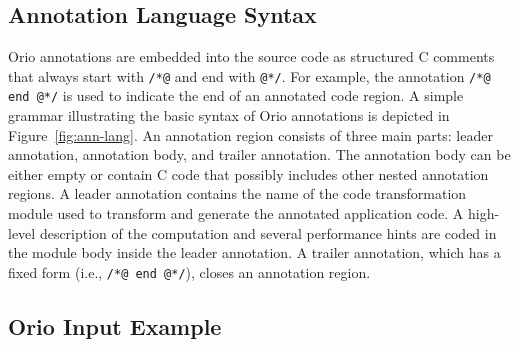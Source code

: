 
\subsection{Annotation Language Syntax} 
\label{sec:ann-lang}

Orio annotations are embedded into the source code as structured C comments
that always start with \texttt{/*@} and end with \texttt{@*/}. For example,
the annotation \texttt{/*@ end @*/} is used to indicate the end of an
annotated code region. A simple grammar illustrating the basic syntax of Orio
annotations is depicted in Figure~\ref{fig:ann-lang}. An annotation region
consists of three main parts: leader annotation, annotation body, and trailer
annotation. The annotation body can be either empty or contain C code that
possibly includes other nested annotation regions. A leader annotation
contains the name of the code transformation module used to transform and
generate the annotated application code. A high-level description of the
computation and several performance hints are coded in the module body inside
the leader annotation. A trailer annotation, which has a fixed form (i.e.,
\texttt{/*@ end @*/}), closes an annotation region.

\subsection{Orio Input Example}
\label{sec:example}

